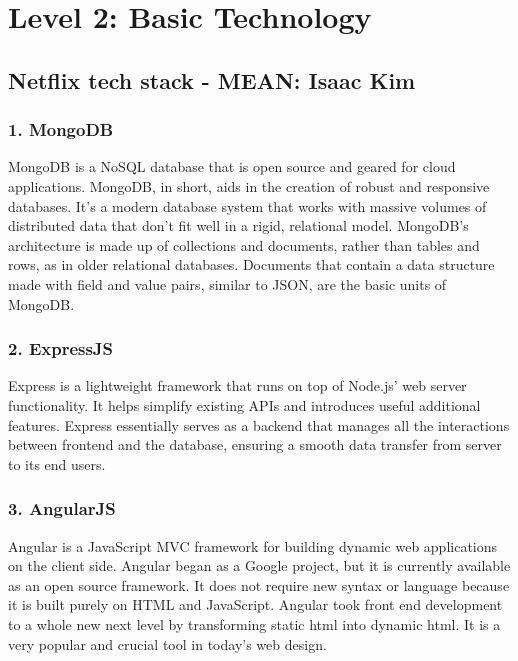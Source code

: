 \documentclass[a4paper, 11pt]{report}
\begin{document}
\newpage
\section{Level 2: Basic Technology}

\subsection{Netflix tech stack - MEAN:  Isaac Kim}

\subsubsection{1. MongoDB}
    MongoDB is a NoSQL database that is open source and geared for cloud applications. \cite{isaac8} MongoDB, in short, aids in the creation of robust and responsive databases. It's a modern database system that works with massive volumes of distributed data that don't fit well in a rigid, relational model. MongoDB's architecture is made up of collections and documents, rather than tables and rows, as in older relational databases. \cite{isaac9} Documents that contain a data structure made with field and value pairs, similar to JSON, are the basic units of MongoDB. \cite{isaac9}

\subsubsection{2. ExpressJS}
	Express is a lightweight framework that runs on top of Node.js' web server functionality. It helps simplify existing APIs and introduces useful additional features. Express essentially serves as a backend that manages all the interactions between frontend and the database, ensuring a smooth data transfer from server to its end users. \cite{isaac8}

\subsubsection{3. AngularJS}
Angular is a JavaScript MVC framework for building dynamic web applications on the client side. \cite{isaac10} Angular began as a Google project, but it is currently available as an open source framework. \cite{isaac8} It does not require new syntax or language because it is built purely on HTML and JavaScript. Angular took front end development to a whole new next level by transforming static html into dynamic html. It is a very popular and crucial tool in today’s web design. 
\end{document}
